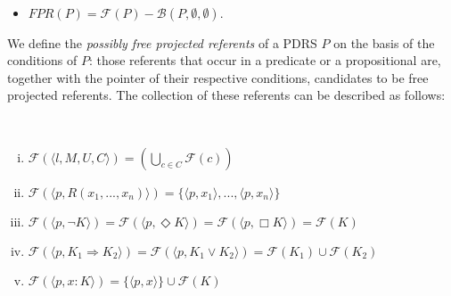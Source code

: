 \begin{definition}~
  \begin{itemize}
    \item $FPR(P) = \mathcal{F}(P) - \mathcal{B}(P,\emptyset,\emptyset)$.
  \end{itemize}
\end{definition}

We define the \textit{possibly free projected referents} of a PDRS $P$ on the
basis of the conditions of $P$: those referents that occur in a predicate or
a propositional are, together with the pointer of their respective
conditions, candidates to be free projected referents. The collection of
these referents can be described as follows:

\begin{subdefinition}~
  \begin{enumerate}[i.]
    \item $\mathcal{F}(\langle l, M, U, C \rangle)
      = (\bigcup_{c\in C} \mathcal{F}(c))$
    \item $\mathcal{F}(\langle p, R(x_1,...,x_n)\rangle)
      = \{\langle p, x_1\rangle, ..., \langle p, x_n\rangle\}$
    \item $\mathcal{F}(\langle p,\neg K\rangle) 
      = \mathcal{F}(\langle p,\Diamond K\rangle) 
      = \mathcal{F}(\langle p,\Box K\rangle)
      = \mathcal{F}(K)$
    \item $\mathcal{F}(\langle p,K_1 \Rightarrow K_2\rangle)
      = \mathcal{F}(\langle p,K_1 \vee K_2\rangle)
      = \mathcal{F}(K_1) \cup \mathcal{F}(K_2)$
    \item $\mathcal{F}(\langle p,x:K\rangle)
      = \{\langle p,x \rangle\} \cup \mathcal{F}(K)$
  \end{enumerate}
\end{subdefinition}

